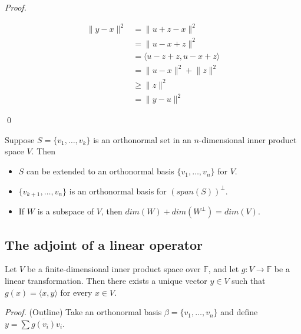\documentclass[12pt]{article}
\newenvironment{theorem}[2][Theorem]{\begin{trivlist}
\item[\hskip \labelsep {\bfseries #1}\hskip \labelsep {\bfseries #2.}]}{\end{trivlist}}
\newenvironment{sol}
    {\emph{Proof.}
    }
    {
    \qed
    }
\begin{document}
\begin{sol}
\begin{align*}
    \lVert y-x \rVert^2 &= \lVert u + z - x \rVert^2 \\
    &= \lVert u - x + z \rVert^2 \\ 
    &= \langle u - z + z, u - x + z \rangle \\
    &= \lVert u - x \rVert^2 + \lVert z \rVert^2 \\
    &\geq \lVert z \rVert^2 \\
    &= \lVert y - u \rVert^2
\end{align*}
\end{sol}

\begin{theorem}{6.7}
Suppose $S = \{v_1, \dots, v_k\}$ is an orthonormal set in an $n$-dimensional inner product space $V$. Then 

\begin{itemize}
    \item[(a)] $S$ can be extended to an orthonormal basis $\{v_1, \dots, v_n\}$ for $V$.
    
    \item[(b)] $\{v_{k+1}, \dots, v_n\}$ is an orthonormal basis for $(span(S))^\perp$.
    
    \item[(c)] If $W$ is a subspace of $V$, then $dim(W) + dim(W^\perp) = dim(V)$.
\end{itemize}
\end{theorem}

\subsection{The adjoint of a linear operator}

\begin{theorem}{6.8}
Let $V$ be a finite-dimensional inner product space over $\mathbb{F}$, and let $g : V \to \mathbb{F}$ be a linear transformation. Then there exists a unique vector $y \in V$ such that $g(x) = \langle x, y \rangle$ for every $x \in V$.
\end{theorem}

\textit{Proof.} (Outline) Take an orthonormal basis $\beta = \{v_1, \dots, v_n\}$ and define $y = \sum \overline{g(v_i)}v_i$.

\vspace{1em}
\end{document}
